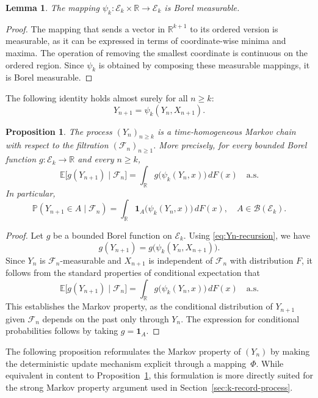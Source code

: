 \documentclass[12pt]{article}
\newtheorem{lemma}[theorem]{Lemma}
\newtheorem{proposition}[theorem]{Proposition}
\theoremstyle{definition}
\begin{document}
\medskip

\begin{lemma}
\label{lem:psi-measurable}
The mapping $\psi_k : \mathcal{E}_k \times \mathbb{R} \to \mathcal{E}_k$ is Borel measurable.
\end{lemma}

\begin{proof}
The mapping that sends a vector in $\mathbb{R}^{k+1}$ to its ordered version is measurable, as it can be expressed in terms of coordinate-wise minima and maxima. The operation of removing the smallest coordinate is continuous on the ordered region. Since $\psi_k$ is obtained by composing these measurable mappings, it is Borel measurable.
\end{proof}

\medskip

The following identity holds almost surely for all $n\ge k$:
\begin{equation}
\label{eq:Yn-recursion}
Y_{n+1} = \psi_k(Y_n, X_{n+1}).
\end{equation}

\begin{proposition}
\label{prop:vector-process-markov}
The process $(Y_n)_{n\ge k}$ is a time-homogeneous Markov chain with respect to the filtration $(\mathcal{F}_n)_{n\ge1}$. More precisely, for every bounded Borel function $g:\mathcal{E}_k\to\mathbb{R}$ and every $n\ge k$,
\[
\mathbb{E}\bigl[g(Y_{n+1}) \mid \mathcal{F}_n\bigr]
=
\int_{\mathbb{R}} g\bigl(\psi_k(Y_n,x)\bigr)\, dF(x)
\quad \text{a.s.}
\]
In particular,
\[
\mathbb{P}(Y_{n+1}\in A \mid \mathcal{F}_n)
=
\int_{\mathbb{R}} \mathbf{1}_A\bigl(\psi_k(Y_n,x)\bigr)\, dF(x),
\quad A\in\mathcal{B}(\mathcal{E}_k).
\]
\end{proposition}

\begin{proof}
Let $g$ be a bounded Borel function on $\mathcal{E}_k$. Using \eqref{eq:Yn-recursion}, we have
\[
g(Y_{n+1}) = g\bigl(\psi_k(Y_n,X_{n+1})\bigr).
\]
Since $Y_n$ is $\mathcal{F}_n$-measurable and $X_{n+1}$ is independent of $\mathcal{F}_n$ with distribution $F$, it follows from the standard properties of conditional expectation that
\[
\mathbb{E}\bigl[g(Y_{n+1}) \mid \mathcal{F}_n\bigr]
=
\int_{\mathbb{R}} g\bigl(\psi_k(Y_n,x)\bigr)\, dF(x)
\quad \text{a.s.}
\]
This establishes the Markov property, as the conditional distribution of $Y_{n+1}$ given $\mathcal{F}_n$ depends on the past only through $Y_n$. The expression for conditional probabilities follows by taking $g=\mathbf{1}_A$.
\end{proof}
The following proposition reformulates the Markov property of $(Y_n)$
by making the deterministic update mechanism explicit through a
mapping~$\Phi$. While equivalent in content to
Proposition~\ref{prop:vector-process-markov}, this formulation is more directly
suited for the strong Markov property argument used in
Section~\ref{sec:k-record-process}.
\end{document}

